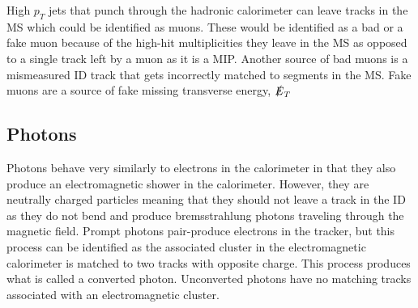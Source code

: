 High $p_T$ jets that punch through the hadronic calorimeter can leave tracks in the MS which could be identified as muons.  These would be identified as a bad or a fake muon because of the high-hit multiplicities they leave in the MS as opposed to a single track left by a muon as it is a MIP.  Another source of bad muons is a mismeasured ID track that gets incorrectly matched to segments in the MS.  Fake muons are a source of fake missing transverse energy, $ \slashed{E}_T$

\subsection{Photons}
Photons behave very similarly to electrons in the calorimeter in that they also produce an electromagnetic shower in the calorimeter.  However, they are neutrally charged particles meaning that they should not leave a track in the ID as they do not bend and produce bremsstrahlung photons traveling through the magnetic field.  Prompt photons pair-produce electrons in the tracker, but this process can be identified as the associated cluster in the electromagnetic calorimeter is matched to two tracks with opposite charge.  This process produces what is called a converted photon.  Unconverted photons have no matching tracks associated with an electromagnetic cluster.    

